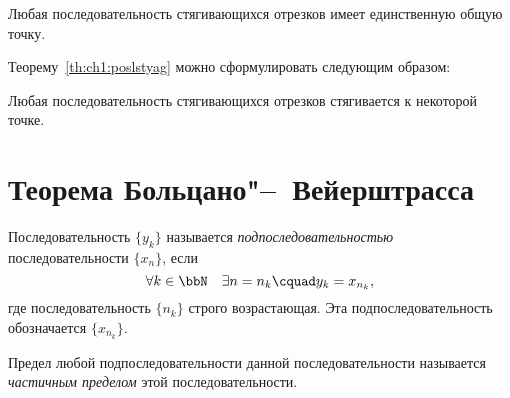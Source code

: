 \begin{thm}
\label{th:ch1:poslstyag}
Любая последовательность стягивающихся отрезков имеет единственную общую точку.
\end{thm}

Теорему~\ref{th:ch1:poslstyag} можно сформулировать следующим образом: 
\begin{thmn}
Любая последовательность стягивающихся отрезков стягивается к некоторой точке.
\end{thmn}

\section{Теорема Больцано"--~Вейерштрасса}
\begin{defn}
Последовательность $\{y_k\}$ называется \textit{подпоследовательностью} последовательности $\{x_n\}$, если 
$$
\forall k \in \bbN \quad \exists n=n_k\cquad y_k=x_{n_k},
$$
где последовательность $\{n_k\}$ строго возрастающая. Эта подпоследовательность обозначается $\{x_{n_k}\}$.
\end{defn}

\begin{defn}
Предел любой подпоследовательности данной последовательности называется \textit{частичным пределом} этой последовательности.
\end{defn}

